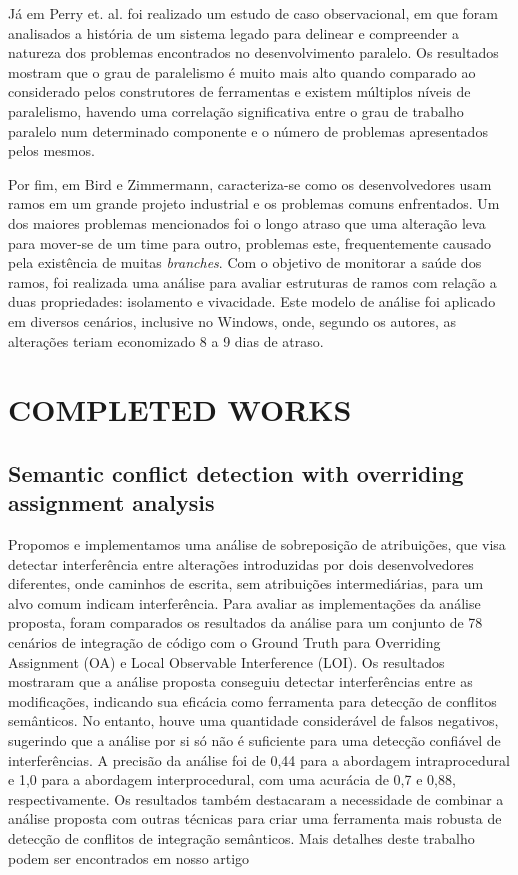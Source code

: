 \documentclass[sigconf,review]{acmart}
\begin{document}
Já em Perry et. al.\cite{10.1145/383876.383878} foi realizado um estudo de caso observacional, em que foram analisados a história de um sistema legado para delinear e compreender a natureza dos problemas encontrados no desenvolvimento paralelo. Os resultados mostram que o grau de paralelismo é muito mais alto quando comparado ao considerado pelos construtores de ferramentas e existem múltiplos níveis de paralelismo, havendo uma correlação significativa entre o grau de trabalho paralelo num determinado componente e o número de problemas apresentados pelos mesmos. 

Por fim, em Bird e Zimmermann\cite{Bird2012AssessingTV}, caracteriza-se como os desenvolvedores usam ramos em um grande projeto industrial e os problemas comuns enfrentados. Um dos maiores problemas mencionados foi o longo atraso que uma alteração leva para mover-se de um time para outro, problemas este, frequentemente causado pela existência de muitas \emph{branches}. Com o objetivo de monitorar a saúde dos ramos, foi realizada uma análise para avaliar estruturas de ramos com relação a duas propriedades: isolamento e vivacidade. Este modelo de análise foi aplicado em diversos cenários, inclusive no Windows, onde, segundo os autores, as alterações teriam economizado 8 a 9 dias de atraso.



\section{COMPLETED WORKS}

\subsection{Semantic conflict detection with overriding assignment analysis}
Propomos e implementamos uma análise de sobreposição de atribuições, que visa detectar interferência entre alterações introduzidas por dois desenvolvedores diferentes, onde caminhos de escrita, sem atribuições intermediárias, para um alvo comum indicam interferência. Para avaliar as implementações da análise proposta, foram comparados os resultados da análise para um conjunto de 78 cenários de integração de código com o Ground Truth para Overriding Assignment (OA) e Local Observable Interference (LOI). Os resultados mostraram que a análise proposta conseguiu detectar interferências entre as modificações, indicando sua eficácia como ferramenta para detecção de conflitos semânticos. No entanto, houve uma quantidade considerável de falsos negativos, sugerindo que a análise por si só não é suficiente para uma detecção confiável de interferências. A precisão da análise foi de 0,44 para a abordagem intraprocedural e 1,0 para a abordagem interprocedural, com uma acurácia de 0,7 e 0,88, respectivamente. Os resultados também destacaram a necessidade de combinar a análise proposta com outras técnicas para criar uma ferramenta mais robusta de detecção de conflitos de integração semânticos. 
Mais detalhes deste trabalho podem ser encontrados em nosso artigo \cite{10.1145/3555228.3555242}
\end{document}
